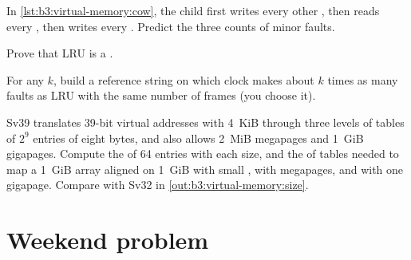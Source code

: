 \begin{exercise}[$\star\star$]\label{exo:b3:virtual-memory:9}
In \cref{lst:b3:virtual-memory:cow}, the child first writes every other , then reads every , then writes every . Predict the three counts of minor faults.
\end{exercise}

\begin{exercise}[$\star\star\star$]\label{exo:b3:virtual-memory:10}
Prove that LRU is a .
\end{exercise}

\begin{exercise}[$\star\star\star$]\label{exo:b3:virtual-memory:11}
For any $k$, build a reference string on which clock makes about $k$ times as many faults as LRU with the same number of frames (you choose it).
\end{exercise}

\begin{exercise}[$\star\star\star$]\label{exo:b3:virtual-memory:12}
Sv39 translates 39-bit virtual addresses with 4~KiB  through three levels of tables of $2^9$ entries of eight bytes, and also allows 2~MiB megapages and 1~GiB gigapages. %
Compute the  of 64 entries with each  size, and the  of tables needed to map a 1~GiB array aligned on 1~GiB with small , with megapages, and with one gigapage. Compare with Sv32 in \cref{out:b3:virtual-memory:size}.
\end{exercise}

\section{Weekend problem}\label{sec:b3:virtual-memory:problem}

